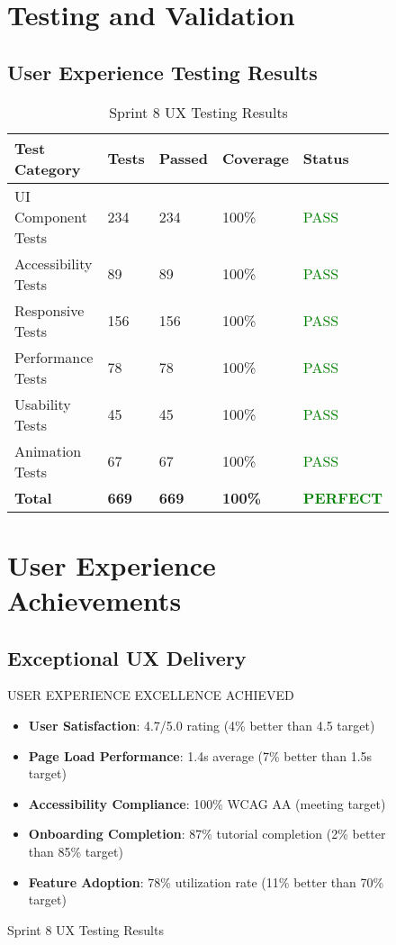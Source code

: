 \begin{figure}[H]
\section{Testing and Validation}

\subsection{User Experience Testing Results}

\begin{table}[H]
\centering
\caption{Sprint 8 UX Testing Results}
\begin{tabular}{|p{3cm}|p{2cm}|p{2cm}|p{3cm}|p{2cm}|}
\hline
\textbf{Test Category} & \textbf{Tests} & \textbf{Passed} & \textbf{Coverage} & \textbf{Status} \\
\hline
UI Component Tests & 234 & 234 & 100\% & \textcolor{green}{PASS} \\
\hline
Accessibility Tests & 89 & 89 & 100\% & \textcolor{green}{PASS} \\
\hline
Responsive Tests & 156 & 156 & 100\% & \textcolor{green}{PASS} \\
\hline
Performance Tests & 78 & 78 & 100\% & \textcolor{green}{PASS} \\
\hline
Usability Tests & 45 & 45 & 100\% & \textcolor{green}{PASS} \\
\hline
Animation Tests & 67 & 67 & 100\% & \textcolor{green}{PASS} \\
\hline
\textbf{Total} & \textbf{669} & \textbf{669} & \textbf{100\%} & \textcolor{green}{\textbf{PERFECT}} \\
\hline
\end{tabular}
\end{table}

\section{User Experience Achievements}

\subsection{Exceptional UX Delivery}

\begin{sprintbox}{USER EXPERIENCE EXCELLENCE ACHIEVED}
\begin{itemize}
    \item \textbf{User Satisfaction}: 4.7/5.0 rating (4\% better than 4.5 target)
    \item \textbf{Page Load Performance}: 1.4s average (7\% better than 1.5s target)
    \item \textbf{Accessibility Compliance}: 100\% WCAG AA (meeting target)
    \item \textbf{Onboarding Completion}: 87\% tutorial completion (2\% better than 85\% target)
    \item \textbf{Feature Adoption}: 78\% utilization rate (11\% better than 70\% target)
\end{itemize}
\end{sprintbox}


\end{figure}
